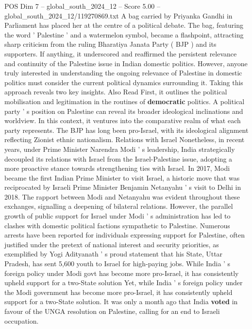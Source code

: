 \begin{textsample}{POS Dim 7 – global\_south\_2024\_12 – Score 5.00 – global\_south\_2024\_12/119270869.txt}  \label{ex:f7_pos_352}
A bag carried by Priyanka Gandhi in Parliament has placed her at the centre of a political debate.
The bag, featuring the word ' Palestine ' and a watermelon symbol, became a flashpoint, attracting sharp criticism from the ruling Bharatiya Janata Party ( BJP ) and its supporters.
If anything, it underscored and reaffirmed the persistent relevance and continuity of the Palestine issue in Indian domestic politics.
However, anyone truly interested in understanding the ongoing relevance of Palestine in domestic politics must consider the current political dynamics surrounding it.
Taking this approach reveals two key insights.
Also Read First, it outlines the political mobilisation and legitimation in the routines of \textbf{democratic} politics.
A political party ' s position on Palestine can reveal its broader ideological inclinations and worldview.
In this context, it ventures into the comparative realm of what each party represents.
The BJP has long been pro-Israel, with its ideological alignment reflecting Zionist ethnic nationalism.
Relations with Israel Nonetheless, in recent years, under Prime Minister Narendra Modi ' s leadership, India strategically decoupled its relations with Israel from the Israel-Palestine issue, adopting a more proactive stance towards strengthening ties with Israel.
In 2017, Modi became the first Indian Prime Minister to visit Israel, a historic move that was reciprocated by Israeli Prime Minister Benjamin Netanyahu ' s visit to Delhi in 2018.
The rapport between Modi and Netanyahu was evident throughout these exchanges, signalling a deepening of bilateral relations.
However, the parallel growth of public support for Israel under Modi ' s administration has led to clashes with domestic political factions sympathetic to Palestine.
Numerous arrests have been reported for individuals expressing support for Palestine, often justified under the pretext of national interest and security priorities, as exemplified by Yogi Adityanath ' s proud statement that his State, Uttar Pradesh, has sent 5,600 youth to Israel for high-paying jobs.
While India ' s foreign policy under Modi govt has become more pro-Israel, it has consistently upheld support for a two-State solution Yet, while India ' s foreign policy under the Modi government has become more pro-Israel, it has consistently upheld support for a two-State solution.
It was only a month ago that India \textbf{voted} in favour of the UNGA resolution on Palestine, calling for an end to Israeli occupation.

\end{textsample}
